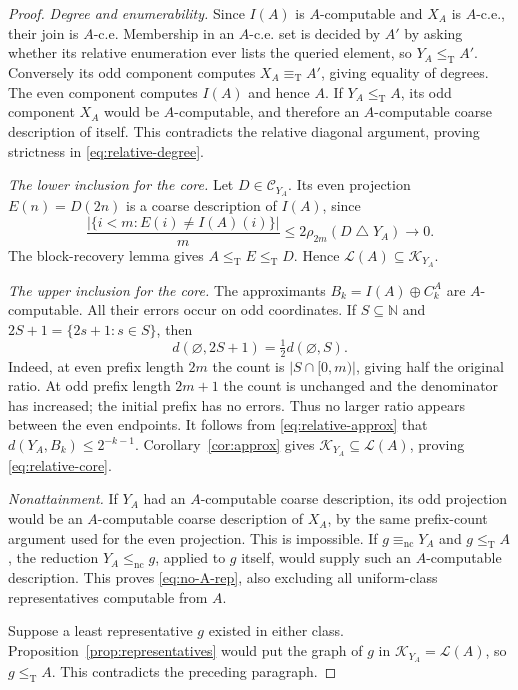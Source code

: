 \documentclass[11pt,a4paper]{article}
\newcommand{\N}{\mathbb N}
\newcommand{\leT}{\leq_{\mathrm T}}
\newcommand{\eqT}{\equiv_{\mathrm T}}
\newcommand{\nc}{\mathrm{nc}}
\newcommand{\CD}[1]{\mathcal C_{#1}}
\newcommand{\Core}[1]{\mathcal K_{#1}}
\newcommand{\Low}[1]{\mathcal L(#1)}
\newcommand{\sdelta}{\mathbin{\triangle}}
\theoremstyle{definition}\newtheorem{definition}[theorem]{Definition}
\theoremstyle{remark}\newtheorem{remark}[theorem]{Remark}
\begin{document}
\begin{proof}
\emph{Degree and enumerability.} Since $I(A)$ is $A$-computable and $X_A$ is $A$-c.e., their join is $A$-c.e. Membership in an $A$-c.e. set is decided by $A'$ by asking whether its relative enumeration ever lists the queried element, so $Y_A\leT A'$. Conversely its odd component computes $X_A\eqT A'$, giving equality of degrees. The even component computes $I(A)$ and hence $A$. If $Y_A\leT A$, its odd component $X_A$ would be $A$-computable, and therefore an $A$-computable coarse description of itself. This contradicts the relative diagonal argument, proving strictness in \eqref{eq:relative-degree}.

\emph{The lower inclusion for the core.} Let $D\in\CD{Y_A}$. Its even projection $E(n)=D(2n)$ is a coarse description of $I(A)$, since
\[
 \frac{|\{i<m:E(i)\ne I(A)(i)\}|}{m}
 \le2\rho_{2m}(D\sdelta Y_A)\longrightarrow0.
\]
The block-recovery lemma gives $A\leT E\leT D$. Hence $\Low A\subseteq\Core{Y_A}$.

\emph{The upper inclusion for the core.} The approximants
$B_k=I(A)\oplus C_k^A$ are $A$-computable. All their errors occur on odd coordinates. If $S\subseteq\N$ and $2S+1=\{2s+1:s\in S\}$, then
\begin{equation}\label{eq:oddnorm}
                  d(\varnothing,2S+1)=\tfrac12d(\varnothing,S).
\end{equation}
Indeed, at even prefix length $2m$ the count is $|S\cap[0,m)|$, giving half the original ratio. At odd prefix length $2m+1$ the count is unchanged and the denominator has increased; the initial prefix has no errors. Thus no larger ratio appears between the even endpoints. It follows from \eqref{eq:relative-approx} that $d(Y_A,B_k)\le2^{-k-1}$. Corollary~\ref{cor:approx} gives $\Core{Y_A}\subseteq\Low A$, proving \eqref{eq:relative-core}.

\emph{Nonattainment.} If $Y_A$ had an $A$-computable coarse description, its odd projection would be an $A$-computable coarse description of $X_A$, by the same prefix-count argument used for the even projection. This is impossible. If $g\equiv_{\nc}Y_A$ and $g\leT A$, the reduction $Y_A\le_{\nc}g$, applied to $g$ itself, would supply such an $A$-computable description. This proves \eqref{eq:no-A-rep}, also excluding all uniform-class representatives computable from $A$.

Suppose a least representative $g$ existed in either class. Proposition~\ref{prop:representatives} would put the graph of $g$ in $\Core{Y_A}=\Low A$, so $g\leT A$. This contradicts the preceding paragraph.


\end{proof}
\end{document}
